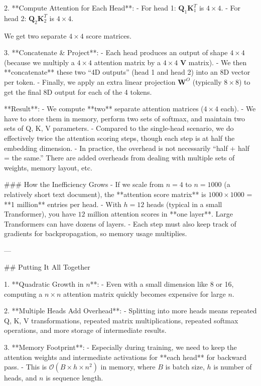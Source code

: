 2. **Compute Attention for Each Head**:  
   - For head 1: \(\mathbf{Q}_1\mathbf{K}_1^T\) is \(4 \times 4\).  
   - For head 2: \(\mathbf{Q}_2\mathbf{K}_2^T\) is \(4 \times 4\).  

   We get two separate \(4 \times 4\) score matrices.

3. **Concatenate & Project**:  
   - Each head produces an output of shape \(4 \times 4\) (because we multiply a \(4 \times 4\) attention matrix by a \(4 \times 4\) \(\mathbf{V}\) matrix).  
   - We then **concatenate** these two “4D outputs” (head 1 and head 2) into an 8D vector per token.  
   - Finally, we apply an extra linear projection \(\mathbf{W}^O\) (typically \(8 \times 8\)) to get the final 8D output for each of the 4 tokens.

**Result**:  
- We compute **two** separate attention matrices (\(4 \times 4\) each).  
- We have to store them in memory, perform two sets of softmax, and maintain two sets of Q, K, V parameters.  
- Compared to the single-head scenario, we do effectively twice the attention scoring steps, though each step is at half the embedding dimension.  
- In practice, the overhead is not necessarily “half + half = the same.” There are added overheads from dealing with multiple sets of weights, memory layout, etc.

### How the Inefficiency Grows
- If we scale from \(n=4\) to \(n=1000\) (a relatively short text document), the **attention score matrix** is \(1000 \times 1000\) = **1 million** entries per head.  
- With \(h=12\) heads (typical in a small Transformer), you have \(12\) million attention scores in **one layer**. Large Transformers can have dozens of layers.  
- Each step must also keep track of gradients for backpropagation, so memory usage multiplies.

---

## Putting It All Together

1. **Quadratic Growth in \(n\)**:  
   - Even with a small dimension like 8 or 16, computing a \(n \times n\) attention matrix quickly becomes expensive for large \(n\).  

2. **Multiple Heads Add Overhead**:  
   - Splitting into more heads means repeated Q, K, V transformations, repeated matrix multiplications, repeated softmax operations, and more storage of intermediate results.

3. **Memory Footprint**:  
   - Especially during training, we need to keep the attention weights and intermediate activations for **each head** for backward pass.  
   - This is \(\mathcal{O}(B \times h \times n^2)\) in memory, where \(B\) is batch size, \(h\) is number of heads, and \(n\) is sequence length.

